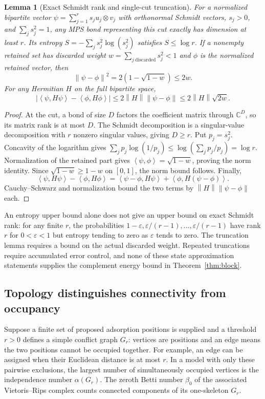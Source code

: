 \documentclass[11pt,a4paper]{article}
\theoremstyle{plain}
\newtheorem{lemma}[theorem]{Lemma}
\theoremstyle{definition}
\theoremstyle{remark}
\newcommand{\norm}[1]{\left\lVert #1\right\rVert}
\newcommand{\ip}[2]{\left\langle #1,#2\right\rangle}
\newcommand{\C}{\mathbb{C}}
\begin{document}
\begin{lemma}[Exact Schmidt rank and single-cut truncation]
\label{lem:schmidt}
For a normalized bipartite vector
$\psi=\sum_{j=1}^r s_j u_j\otimes v_j$ with orthonormal Schmidt vectors,
$s_j>0$, and $\sum_j s_j^2=1$, any MPS bond representing this cut exactly
has dimension at least $r$. Its entropy
$S=-\sum_j s_j^2\log(s_j^2)$ satisfies $S\le\log r$.
If a nonempty retained set has discarded weight
$w=\sum_{j\ \mathrm{discarded}}s_j^2<1$ and $\phi$ is the normalized
retained vector, then
\[
 \norm{\psi-\phi}^2=2(1-\sqrt{1-w})\le2w.
\]
For any Hermitian $H$ on the full bipartite space,
\[
 |\ip{\psi}{H\psi}-\ip{\phi}{H\phi}|
 \le2\norm H\norm{\psi-\phi}\le2\norm H\sqrt{2w}.
\]
\end{lemma}
\begin{proof}
At the cut, a bond of size $D$ factors the coefficient matrix through
$\C^D$, so its matrix rank is at most $D$. The Schmidt decomposition is a
singular-value decomposition with $r$ nonzero singular values, giving
$D\ge r$. Put $p_j=s_j^2$. Concavity of the logarithm gives
$\sum_j p_j\log(1/p_j)\le\log(\sum_j p_j/p_j)=\log r$.
Normalization of the retained part gives
$\ip{\psi}{\phi}=\sqrt{1-w}$, proving the norm identity. Since
$\sqrt{1-w}\ge1-w$ on $[0,1]$, the norm bound follows. Finally,
\[
 \ip{\psi}{H\psi}-\ip{\phi}{H\phi}
 =\ip{\psi-\phi}{H\psi}+\ip{\phi}{H(\psi-\phi)}.
\]
Cauchy--Schwarz and normalization bound the two terms by
$\norm H\norm{\psi-\phi}$ each.
\end{proof}

An entropy upper bound alone does not give an upper bound on exact Schmidt
rank: for any finite $r$, the probabilities
$1-\varepsilon,\varepsilon/(r-1),\ldots,\varepsilon/(r-1)$ have rank
$r$ for $0<\varepsilon<1$ but entropy tending to zero as
$\varepsilon$ tends to zero. The truncation lemma requires a bound on the
actual discarded weight. Repeated truncations require accumulated error
control, and none of these state approximation statements supplies the
complement energy bound in Theorem~\ref{thm:block}.

\subsection{Topology distinguishes connectivity from occupancy}
Suppose a finite set of proposed adsorption positions is supplied and a
threshold $r>0$ defines a simple conflict graph $G_r$: vertices are
positions and an edge means the two positions cannot be occupied together.
For example, an edge can be assigned when their Euclidean distance is at most
$r$. In a model with only these pairwise exclusions, the largest number of
simultaneously occupied vertices is the independence number $\alpha(G_r)$.
The zeroth Betti number $\beta_0$ of the associated Vietoris--Rips complex
counts connected components of its one-skeleton $G_r$.
\end{document}
